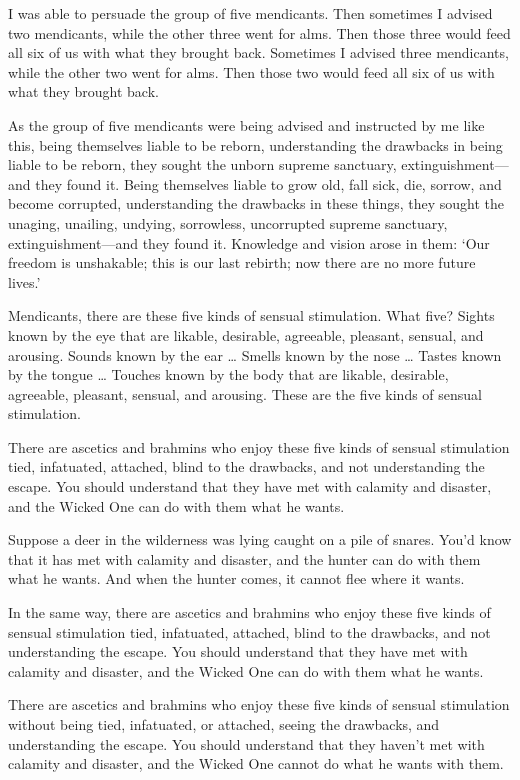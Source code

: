 \documentclass[12pt,openany]{book}%
\begin{document}
I was able to persuade the group of five mendicants. Then sometimes I advised two mendicants, while the other three went for alms. Then those three would feed all six of us with what they brought back. Sometimes I advised three mendicants, while the other two went for alms. Then those two would feed all six of us with what they brought back. 

As the group of five mendicants were being advised and instructed by me like this, being themselves liable to be reborn, understanding the drawbacks in being liable to be reborn, they sought the unborn supreme sanctuary, extinguishment—and they found it. Being themselves liable to grow old, fall sick, die, sorrow, and become corrupted, understanding the drawbacks in these things, they sought the unaging, unailing, undying, sorrowless, uncorrupted supreme sanctuary, extinguishment—and they found it. Knowledge and vision arose in them: ‘Our freedom is unshakable; this is our last rebirth; now there are no more future lives.’ 

Mendicants, there are these five kinds of sensual stimulation. What five? Sights known by the eye that are likable, desirable, agreeable, pleasant, sensual, and arousing. Sounds known by the ear … Smells known by the nose … Tastes known by the tongue … Touches known by the body that are likable, desirable, agreeable, pleasant, sensual, and arousing. These are the five kinds of sensual stimulation. 

There are ascetics and brahmins who enjoy these five kinds of sensual stimulation tied, infatuated, attached, blind to the drawbacks, and not understanding the escape. You should understand that they have met with calamity and disaster, and the Wicked One can do with them what he wants. 

Suppose a deer in the wilderness was lying caught on a pile of snares. You’d know that it has met with calamity and disaster, and the hunter can do with them what he wants. And when the hunter comes, it cannot flee where it wants. 

In the same way, there are ascetics and brahmins who enjoy these five kinds of sensual stimulation tied, infatuated, attached, blind to the drawbacks, and not understanding the escape. You should understand that they have met with calamity and disaster, and the Wicked One can do with them what he wants. 

There are ascetics and brahmins who enjoy these five kinds of sensual stimulation without being tied, infatuated, or attached, seeing the drawbacks, and understanding the escape. You should understand that they haven’t met with calamity and disaster, and the Wicked One cannot do what he wants with them. 
\end{document}
